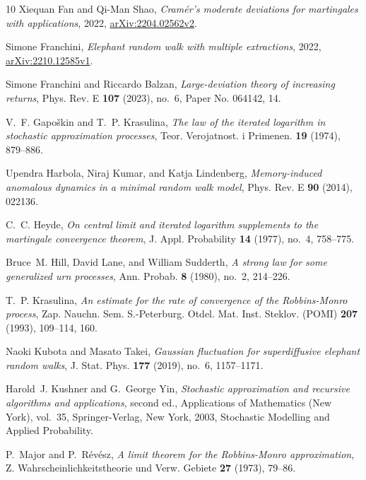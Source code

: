 \documentclass[12pt]{amsart}
\theoremstyle{plain}
\theoremstyle{remark}
\numberwithin{equation}{section}
\begin{document}
\begin{thebibliography}{10}
Xiequan Fan and Qi-Man Shao, \emph{Cram\'{e}r's moderate deviations for martingales with applications}, 2022, \href{https://arxiv.org/abs/2204.02562v2}{arXiv:2204.02562v2}.

Simone Franchini, \emph{Elephant random walk with multiple extractions}, 2022, \href{https://arxiv.org/abs/2210.12585v1}{arXiv:2210.12585v1}.

Simone Franchini and Riccardo Balzan, \emph{Large-deviation theory of increasing returns}, Phys. Rev. E \textbf{107} (2023), no.~6, Paper No. 064142, 14. 

V.~F. Gapo\v{s}kin and T.~P. Krasulina, \emph{The law of the iterated logarithm in stochastic approximation processes}, Teor. Verojatnost. i Primenen. \textbf{19} (1974), 879--886. 

Upendra Harbola, Niraj Kumar, and Katja Lindenberg, \emph{Memory-induced anomalous dynamics in a minimal random walk model}, Phys. Rev. E \textbf{90} (2014), 022136.

C.~C. Heyde, \emph{On central limit and iterated logarithm supplements to the martingale convergence theorem}, J. Appl. Probability \textbf{14} (1977), no.~4, 758--775. 

Bruce~M. Hill, David Lane, and William Sudderth, \emph{A strong law for some generalized urn processes}, Ann. Probab. \textbf{8} (1980), no.~2, 214--226. 

T.~P. Krasulina, \emph{An estimate for the rate of convergence of the {R}obbins-{M}onro process}, Zap. Nauchn. Sem. S.-Peterburg. Otdel. Mat. Inst. Steklov. (POMI) \textbf{207} (1993), 109--114, 160. 

Naoki Kubota and Masato Takei, \emph{Gaussian fluctuation for superdiffusive elephant random walks}, J. Stat. Phys. \textbf{177} (2019), no.~6, 1157--1171. 

Harold~J. Kushner and G.~George Yin, \emph{Stochastic approximation and recursive algorithms and applications}, second ed., Applications of Mathematics (New York), vol.~35, Springer-Verlag, New York, 2003, Stochastic Modelling and Applied Probability. 

P.~Major and P.~R\'{e}v\'{e}sz, \emph{A limit theorem for the {R}obbins-{M}onro approximation}, Z. Wahrscheinlichkeitstheorie und Verw. Gebiete \textbf{27} (1973), 79--86. 


\end{thebibliography}
\end{document}
